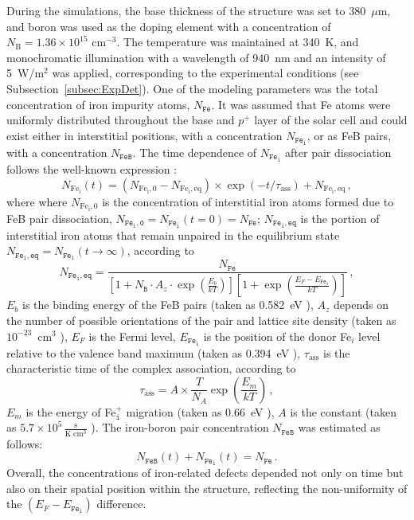 \documentclass[10pt]{iopart}
\begin{document}
During the simulations, the base thickness of the structure was set to 380~$\mu$m,
and boron was used as the doping element with a concentration of $N_\mathrm{B} = 1.36 \times 10^{15}$ cm$^{-3}$.
The temperature was maintained at 340~K, and monochromatic illumination with a wavelength of  940~nm and an intensity of 5~W/m$^{2}$
was applied, corresponding to the experimental conditions (see Subsection~\ref{subsec:ExpDet}).
One of the modeling parameters was the total concentration of iron impurity atoms, $N_\mathtt{Fe}$.
It was assumed that Fe atoms were uniformly distributed throughout the base and $p^+$ layer of the solar cell
and could exist either in interstitial positions, with a concentration $N_\mathtt{Fe_i}$, or as FeB pairs, with a concentration $N_\mathtt{FeB}$.
The time dependence of $N_\mathtt{Fe_i}$ after pair dissociation follows the well-known expression \cite{MurphyJAP2011, Wijaranakula}:
\begin{equation}
\label{eqNFet}
N_\mathrm{Fe_i}(t)=(N_\mathrm{Fe_i,0}-N_\mathrm{Fe_i,eq})\times
\exp(-t/\tau_\mathrm{ass})+N_\mathrm{Fe_i,eq}\,,
\end{equation}
where
where $N_\mathrm{Fe_i,0}$ is the concentration of interstitial iron atoms formed due to FeB pair dissociation,
$N_\mathtt{Fe_i,0} = N_\mathtt{Fe_i}(t=0) = N_\mathtt{Fe}$;
$N_\mathtt{Fe_i,eq}$ is the portion of interstitial iron atoms that remain unpaired in the equilibrium state
$N_\mathtt{Fe_i,eq}=N_\mathtt{Fe_i}(t \rightarrow \infty)$,
according to \cite{MurphyJAP2011, Wijaranakula}
\begin{equation}\label{eqFeieq}
  N_\mathtt{Fe_i,eq}=\frac{N_\mathtt{Fe}}{\left[1+N_\mathtt{B}\cdot A_z \cdot \exp\left(\frac{E_b}{kT}\right)\right]
  \left[1+\exp\left(\frac{E_F-E_\mathtt{Fe_i}}{kT}\right)\right]}\,,
\end{equation}
$E_b$ is the binding energy of the FeB pairs (taken as 0.582~eV \cite{Wijaranakula}),
$A_z $ depends on the number of possible orientations of the pair and lattice site density
(taken as $10^{-23}$~cm$^3$ \cite{MurphyJAP2011}),
$E_F$ is the Fermi level,
$E_\mathtt{Fe_i}$ is the position of the donor Fe$_i$ level relative to the valence band maximum
(taken as 0.394~eV \cite{FeBAssJAP2014}),
$\tau_\mathrm{ass}$ is the characteristic time of the complex association,
according to \cite{FeBKin2019,FeBAssJAP2014,FeBAssSST2011}
\begin{equation}
\label{eqTass}
\tau_\mathrm{ass}=A\times\frac{T}{N_A}\exp\left(\frac{E_m}{kT}\right)\,,
\end{equation}
$E_m$ is the energy of Fe$_\mathtt{i}^+$ migration (taken as 0.66~eV \cite{FeBAssJAP2014,FeBKin2019,FeBAssSST2011}),
$A$ is the constant (taken as $5.7\times10^5\,\frac{\mathrm{s}}{\mathrm{K}\;\mathrm{cm}^3}$ \cite{FeBAssSST2011}).
The iron-boron pair concentration $N_\mathtt{FeB}$ was estimated as follows:
\begin{equation}\label{eqNFeB}
  N_\mathtt{FeB}(t)+N_\mathtt{Fe_i}(t)=N_\mathtt{Fe}\,.
\end{equation}
Overall, the concentrations of iron-related defects depended not only on time but
also on their spatial position within the structure, reflecting the non-uniformity of the $(E_F-E_\mathtt{Fe_i})$ difference.
\end{document}
